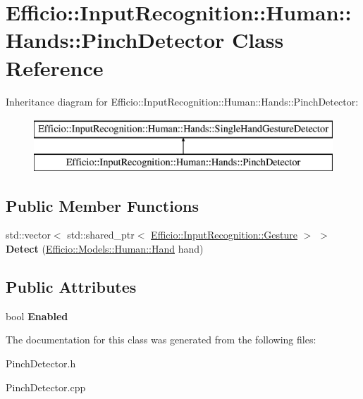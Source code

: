 \hypertarget{class_efficio_1_1_input_recognition_1_1_human_1_1_hands_1_1_pinch_detector}{}\section{Efficio\+:\+:Input\+Recognition\+:\+:Human\+:\+:Hands\+:\+:Pinch\+Detector Class Reference}
\label{class_efficio_1_1_input_recognition_1_1_human_1_1_hands_1_1_pinch_detector}
Inheritance diagram for Efficio\+:\+:Input\+Recognition\+:\+:Human\+:\+:Hands\+:\+:Pinch\+Detector\+:\begin{figure}[H]
\begin{center}
\leavevmode
\includegraphics[height=2.000000cm]{class_efficio_1_1_input_recognition_1_1_human_1_1_hands_1_1_pinch_detector}
\end{center}
\end{figure}
\subsection*{Public Member Functions}
\begin{DoxyCompactItemize}
\item 
std\+::vector$<$ std\+::shared\+\_\+ptr$<$ \hyperlink{class_efficio_1_1_input_recognition_1_1_gesture}{Efficio\+::\+Input\+Recognition\+::\+Gesture} $>$ $>$ {\bfseries Detect} (\hyperlink{class_efficio_1_1_models_1_1_human_1_1_hand}{Efficio\+::\+Models\+::\+Human\+::\+Hand} hand)\hypertarget{class_efficio_1_1_input_recognition_1_1_human_1_1_hands_1_1_pinch_detector_adbcb02b1c08d9ebf4bfa6e8546bfda3f}{}\label{class_efficio_1_1_input_recognition_1_1_human_1_1_hands_1_1_pinch_detector_adbcb02b1c08d9ebf4bfa6e8546bfda3f}

\end{DoxyCompactItemize}
\subsection*{Public Attributes}
\begin{DoxyCompactItemize}
\item 
bool {\bfseries Enabled}\hypertarget{class_efficio_1_1_input_recognition_1_1_human_1_1_hands_1_1_pinch_detector_ace7cbaf0cc98103be15dfdc621a49f3f}{}\label{class_efficio_1_1_input_recognition_1_1_human_1_1_hands_1_1_pinch_detector_ace7cbaf0cc98103be15dfdc621a49f3f}

\end{DoxyCompactItemize}


The documentation for this class was generated from the following files\+:\begin{DoxyCompactItemize}
\item 
Pinch\+Detector.\+h\item 
Pinch\+Detector.\+cpp\end{DoxyCompactItemize}
